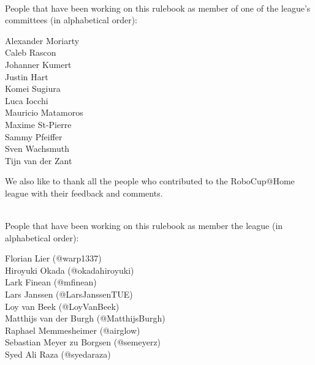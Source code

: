 ~\\\noindent People that have been working on this rulebook as member of one of the league's committees (in alphabetical order):
\begin{center}
\begin{minipage}{0.8\textwidth}
\begin{multicols}{3}%
\footnotesize
\noindent%

Alexander Moriarty\\
Caleb Rascon\\
Johanner Kumert\\
Justin Hart\\
\columnbreak
Komei Sugiura\\
Luca Iocchi\\
Mauricio Matamoros\\
Maxime St-Pierre \\
\columnbreak
Sammy Pfeiffer\\
Sven Wachsmuth\\
Tijn van der Zant\\
\end{multicols}
\end{minipage}
\end{center}

We also like to thank all the people who contributed to the RoboCup@Home league with their feedback and comments.

~\\\noindent People that have been working on this rulebook as member the league (in alphabetical order):
\begin{center}
\begin{minipage}{0.8\textwidth}
\begin{multicols}{2}%
\footnotesize
\noindent%
Florian Lier (@warp1337)\\
Hiroyuki Okada (@okadahiroyuki)\\
Lark Finean (@mfinean)\\
\columnbreak%
Lars Janssen (@LarsJanssenTUE)\\
Loy van Beek (@LoyVanBeek)\\
Matthijs van der Burgh (@MatthijsBurgh)\\
\columnbreak%
Raphael Memmesheimer (@airglow)\\
Sebastian Meyer zu Borgsen (@semeyerz)\\
Syed Ali Raza (@syedaraza)\\
\end{multicols}
\end{minipage}
\end{center}


